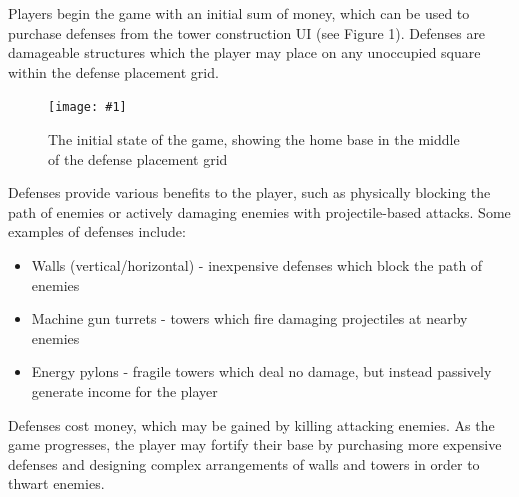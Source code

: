 \documentclass[letterpaper]{article}
\def\imfig#1#2{\begin{figure}[h] \centering \texttt{[image: \#1]} \caption{#2} \end{figure}}
\begin{document}
Players begin the game with an initial sum of money, which can be used to purchase defenses from the tower construction UI (see Figure 1). Defenses are damageable structures which the player may place on any unoccupied square within the defense placement grid.
\imfig{ZoomedOut}{The initial state of the game, showing the home base in the middle of the defense placement grid}

Defenses provide various benefits to the player, such as physically blocking the path of enemies or actively damaging enemies with projectile-based attacks. Some examples of defenses include:
\begin{itemize}
	\item Walls (vertical/horizontal) - inexpensive defenses which block the path of enemies
	\item Machine gun turrets - towers which fire damaging projectiles at nearby enemies
	\item Energy pylons - fragile towers which deal no damage, but instead passively generate income for the player
\end{itemize}

Defenses cost money, which may be gained by killing attacking enemies. As the game progresses, the player may fortify their base by purchasing more expensive defenses and designing complex arrangements of walls and towers in order to thwart enemies.
\end{document}
